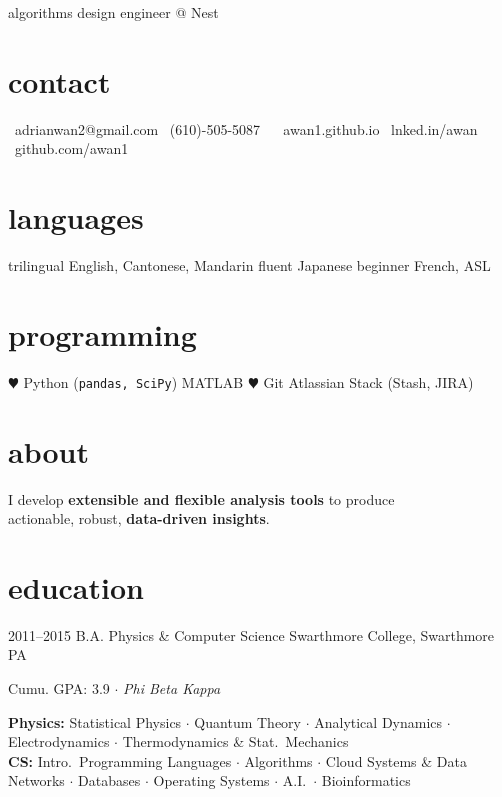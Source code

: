 \documentclass[]{friggeri-cv}
\begin{document}
       {algorithms design engineer @ Nest}


\begin{aside}
  \section{contact}
    \href{mailto:adrianwan2@gmail.com}{\faEnvelope}~adrianwan2@gmail.com
    \faPhone~(610)-505-5087
    ~
    \href{http://awan1.github.io}{\faGlobe}~awan1.github.io
    \href{http://linkedin.com/in/adrianwan2}{\faLinkedin}~lnked.in/awan
    \href{http://github.com/awan1}{\faGithub}~github.com/awan1
  \section{languages}
    trilingual English, Cantonese, Mandarin
    fluent Japanese
    beginner French, ASL
  \section{programming}
    {\color{red} $\varheart$} Python
    (\texttt{pandas, SciPy})
    MATLAB
    {\color{red} $\varheart$} Git
    Atlassian Stack
    (Stash, JIRA)

\end{aside}

\section{about}
I develop \textbf{extensible and flexible analysis tools} to produce \\
actionable, robust, \textbf{data-driven insights}.

\section{education}

\begin{entrylist}
  \entry
    {2011--2015}
    {B.A. {\normalfont Physics \& Computer Science}}
    {Swarthmore College, Swarthmore PA}
    {Cumu. GPA: 3.9 $\cdot$ \emph{Phi Beta Kappa} %
     \smallskip

     \textbf{Physics:}
     Statistical Physics $\cdot$
     Quantum Theory $\cdot$
     Analytical Dynamics $\cdot$
     \\
     Electrodynamics $\cdot$
     Thermodynamics \& Stat.\ Mechanics %
     \\
     \textbf{CS:}
     Intro.\ Programming Languages $\cdot$
     Algorithms $\cdot$
     Cloud Systems \& Data \\ Networks $\cdot$
     Databases $\cdot$
     Operating Systems $\cdot$
     A.I.\ $\cdot$
     Bioinformatics %
     }
\end{entrylist}
\end{document}
